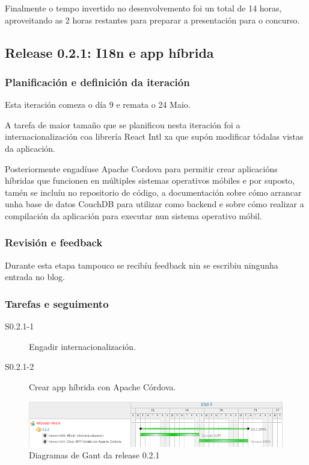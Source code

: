      Finalmente o tempo invertido no desenvolvemento foi un total de 14 
horas, aproveitando as 2 horas restantes para preparar a 
presentación para o concurso.

    \subsection{Release 0.2.1: I18n e app híbrida}

      \subsubsection{Planificación e definición da iteración}
      Esta iteración comeza o día 9 e remata o 24 Maio.

      A tarefa de maior tamaño que se planificou nesta iteración foi a 
internacionalización coa librería React Intl xa que supón modificar tódalas 
vistas da aplicación.

      Posteriormente engadíuse Apache Cordova para permitir crear aplicacións 
híbridas que funcionen en múltiples sistemas operativos móbiles e por suposto, 
tamén se incluíu no repositorio de código, a documentación sobre cómo arrancar 
unha base de datos CouchDB para utilizar como backend e sobre cómo realizar a 
compilación da aplicación para executar nun sistema operativo móbil.

      \subsubsection{Revisión e feedback}
      Durante esta etapa tampouco se recibíu feedback nin se escribiu ningunha 
entrada no blog.

      \subsubsection{Tarefas e seguimento}
        \begin{description}
        \item [S0.2.1-1] Engadir internacionalización.
        \item [S0.2.1-2] Crear app híbrida con Apache Córdova.
        \end{description}

        \begin{figure}[h!]
          \begin{center}
          \includegraphics[width=\textwidth]{./img/gant_diagrams/021.png}
          \caption{Diagramas de Gant da release 0.2.1}
          \label{fig:gant21}
          \end{center}
        \end{figure}

